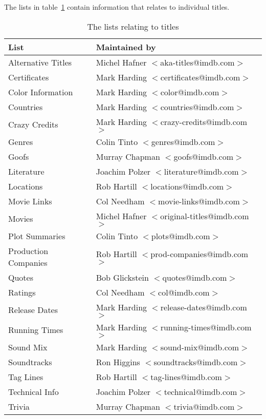 The lists in table~\ref{tbl:title} contain information that relates 
to individual titles.
\begin{table}
\begin{center}
{\small
\begin{tabular}{|l|l|} \hline
List  & Maintained by  \\ \hline
Alternative Titles  & Michel Hafner $<$aka-titles@imdb.com$>$ \\ \hline
Certificates & Mark Harding $<$certificates@imdb.com$>$ \\ \hline
Color Information & Mark Harding $<$color@imdb.com$>$ \\ \hline
Countries & Mark Harding $<$countries@imdb.com$>$ \\ \hline
Crazy Credits       & Mark Harding $<$crazy-credits@imdb.com$>$ \\ \hline
Genres              & Colin Tinto $<$genres@imdb.com$>$ \\ \hline
Goofs               & Murray Chapman $<$goofs@imdb.com$>$ \\ \hline
Literature          & Joachim Polzer $<$literature@imdb.com$>$ \\ \hline
Locations           & Rob Hartill $<$locations@imdb.com$>$ \\ \hline
Movie Links         & Col Needham $<$movie-links@imdb.com$>$ \\ \hline
Movies              & Michel Hafner $<$original-titles@imdb.com$>$ \\ \hline
Plot Summaries      & Colin Tinto $<$plots@imdb.com$>$ \\ \hline
Production Companies & Rob Hartill $<$prod-companies@imdb.com$>$ \\ \hline
Quotes              & Bob Glickstein $<$quotes@imdb.com$>$ \\ \hline
Ratings             & Col Needham $<$col@imdb.com$>$ \\ \hline
Release Dates       & Mark Harding $<$release-dates@imdb.com$>$  \\ \hline
Running Times       & Mark Harding $<$running-times@imdb.com$>$  \\ \hline
Sound Mix       & Mark Harding $<$sound-mix@imdb.com$>$  \\ \hline
Soundtracks         & Ron Higgins $<$soundtracks@imdb.com$>$ \\ \hline
Tag Lines            & Rob Hartill $<$tag-lines@imdb.com$>$ \\ \hline
Technical Info       & Joachim Polzer $<$technical@imdb.com$>$ \\ \hline
Trivia              & Murray Chapman $<$trivia@imdb.com$>$ \\ \hline
\end{tabular}}
\caption{\label{tbl:title} The lists relating to titles}
\end{center}
\end{table}

